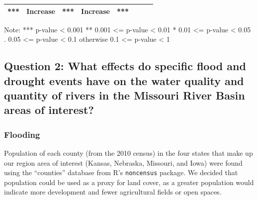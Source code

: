 \documentclass[12pt,]{article}
\begin{document}
\begin{longtable}[]{@{}cccccccc@{}}
\begin{minipage}[t]{0.13\columnwidth}
***\strut
\end{minipage} & \begin{minipage}[t]{0.08\columnwidth}\centering
Increase\strut
\end{minipage} & \begin{minipage}[t]{0.16\columnwidth}\centering
***\strut
\end{minipage} & \begin{minipage}[t]{0.09\columnwidth}\centering
Increase\strut
\end{minipage} & \begin{minipage}[t]{0.13\columnwidth}\centering
***\strut
\end{minipage}\tabularnewline
\bottomrule
\end{longtable}

Note: *** p-value \textless{} 0.001 ** 0.001 \textless{}= p-value
\textless{} 0.01 * 0.01 \textless{}= p-value \textless{} 0.05 . 0.05
\textless{}= p-value \textless{} 0.1 otherwise 0.1 \textless{}= p-value
\textless{} 1

\hypertarget{question-2-what-effects-do-specific-flood-and-drought-events-have-on-the-water-quality-and-quantity-of-rivers-in-the-missouri-river-basin-areas-of-interest}{%
\subsection{Question 2: What effects do specific flood and drought
events have on the water quality and quantity of rivers in the Missouri
River Basin areas of
interest?}\label{question-2-what-effects-do-specific-flood-and-drought-events-have-on-the-water-quality-and-quantity-of-rivers-in-the-missouri-river-basin-areas-of-interest}}

\hypertarget{flooding}{%
\subsubsection{Flooding}\label{flooding}}

Population of each county (from the 2010 census) in the four states that
make up our region area of interest (Kansas, Nebraska, Missouri, and
Iowa) were found using the ``counties'' database from R's
\texttt{noncensus} package. We decided that population could be used as
a proxy for land cover, as a greater population would indicate more
development and fewer agricultural fields or open spaces.
\end{document}
